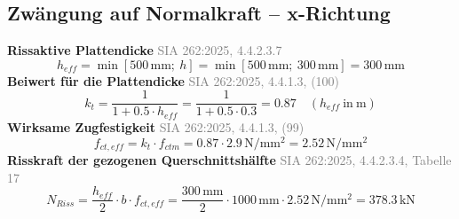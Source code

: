 \documentclass[11pt,a4paper]{article}
\newcommand{\normref}[1]{{\small\textcolor{gray}{#1}}}
\begin{document}
\subsection{Zwängung auf Normalkraft – x-Richtung}
\noindent\textbf{Rissaktive Plattendicke} \hfill \normref{SIA 262:2025, 4.4.2.3.7}
\begin{equation*}
h_{eff} = \min\left[500\,\mathrm{mm};\ h\right] = \min\left[500\,\mathrm{mm};\ 300\,\mathrm{mm}\right] = 300\,\mathrm{mm}
\end{equation*}
\noindent\textbf{Beiwert für die Plattendicke} \hfill \normref{SIA 262:2025, 4.4.1.3, (100)}
\begin{equation*}
k_t = \frac{1}{1 + 0.5 \cdot h_{eff}} = \frac{1}{1 + 0.5 \cdot 0.3} = 0.87 \quad \left(h_{eff}\ \text{in}\ \mathrm{m}\right)
\end{equation*}
\noindent\textbf{Wirksame Zugfestigkeit} \hfill \normref{SIA 262:2025, 4.4.1.3, (99)}
\begin{equation*}
f_{ct,eff} = k_t \cdot f_{ctm} = 0.87 \cdot 2.9\,\mathrm{N}/\mathrm{mm}^{2} = 2.52\,\mathrm{N}/\mathrm{mm}^{2}
\end{equation*}
\noindent\textbf{Risskraft der gezogenen Querschnittshälfte} \hfill \normref{SIA 262:2025, 4.4.2.3.4, Tabelle 17}
\begin{equation*}
N_{Riss} = \frac{h_{eff}}{2} \cdot b \cdot f_{ct,eff} = \frac{300\,\mathrm{mm}}{2} \cdot 1000\,\mathrm{mm} \cdot 2.52\,\mathrm{N}/\mathrm{mm}^{2} = 378.3\,\mathrm{kN}
\end{equation*}
\end{document}
